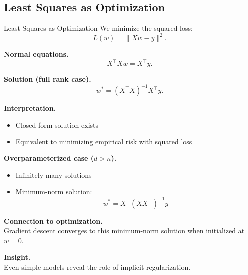 \documentclass[aspectratio=169,11pt]{beamer}
\begin{document}
\subsection{Least Squares as Optimization}
\begin{frame}[t,allowframebreaks]{Least Squares as Optimization}
\small
We minimize the squared loss:
\[
L(w) = \|Xw - y\|^2.
\]

\textbf{Normal equations.}\\ \[
X^\top X w = X^\top y.
\]

\textbf{Solution (full rank case).}\\ \[
w^* = (X^\top X)^{-1} X^\top y.
\]

\textbf{Interpretation.}\\ \begin{itemize}
    \item Closed-form solution exists
    \item Equivalent to minimizing empirical risk with squared loss
\end{itemize}

\textbf{Overparameterized case ($d > n$).}\\ \begin{itemize}
    \item Infinitely many solutions
    \item Minimum-norm solution:
    \[
    w^* = X^\top (XX^\top)^{-1} y
    \]
\end{itemize}

\textbf{Connection to optimization.}\\ Gradient descent converges to this minimum-norm solution when initialized at $w=0$.

\textbf{Insight.}\\ Even simple models reveal the role of implicit regularization.
\end{frame}
\end{document}
